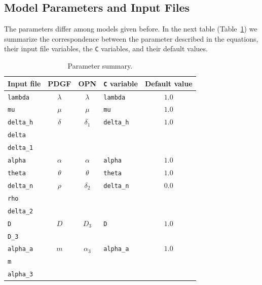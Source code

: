 \documentclass{amsproc}
\theoremstyle{definition}
\theoremstyle{remark}
\numberwithin{equation}{section}
\numberwithin{figure}{section}
\begin{document}
\subsection{Model Parameters and Input Files}
The parameters differ among models given before. 
In the next table (Table~\ref{tb:par}) we summarize the correspondence between the parameter described in the equations, their input file variables, the \texttt{C} variables, and their default values.
\begin{table}[ht]\centering
\setlength{\tabcolsep}{3pt}
\caption{Parameter summary.}
\label{tb:par}
\begin{tabular}{|l||c|c|l|c|}
\hline
Input file        & PDGF      & OPN        & \texttt{C} variable & Default value \\ \hline \hline
\texttt{lambda}   & $\lambda$ & $\lambda$  & \texttt{lambda}     & $1.0$         \\ \hline
\texttt{mu}       & $\mu$     & $\mu$      & \texttt{mu}         & $1.0$         \\ \hline
\texttt{delta\_h} & $\delta$  & $\delta_1$ & \texttt{delta\_h}   & $1.0$         \\
\texttt{delta}    &           &            &                     &               \\
\texttt{delta\_1} &           &            &                     &               \\ \hline
\texttt{alpha}    & $\alpha$  & $\alpha$   & \texttt{alpha}      & $1.0$         \\ \hline
\texttt{theta}    & $\theta$  & $\theta$   & \texttt{theta}      & $1.0$         \\ \hline
\texttt{delta\_n} & $\rho$    & $\delta_2$ & \texttt{delta\_n}   & $0.0$         \\
\texttt{rho}      &           &            &                     &               \\
\texttt{delta\_2} &           &            &                     &               \\ \hline
\texttt{D}        & $D$       & $D_3$      & \texttt{D}          & $1.0$         \\
\texttt{D\_3}     &           &            &                     &               \\ \hline
\texttt{alpha\_a} & $m$       & $\alpha_3$ & \texttt{alpha\_a}   & $1.0$         \\
\texttt{m}        &           &            &                     &               \\
\texttt{alpha\_3} &           &            &                     &               \\ \hline

\end{tabular}
\end{table}
\end{document}
